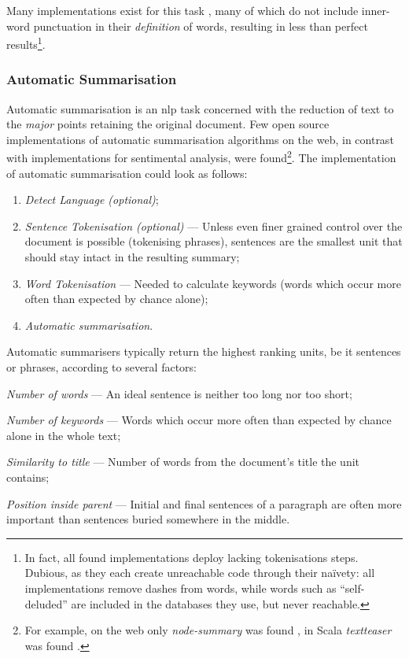 Many implementations exist for this task
  \autocites{thinkroth/sentimental-source-code}{mileszim/sediment-source-code}
  {thisandagain/sentiment-source-code}, many of which do not include
  inner-word punctuation in their \emph{definition} of words, resulting in
  less than perfect results\footnote{In fact, all found implementations
      deploy lacking tokenisations steps.
    Dubious, as they each create unreachable code through their na\"ivety:
      all implementations remove dashes from words, while words such as
      ``self-deluded'' are included in the databases they use, but never
      reachable.}.

\subsubsection{Automatic Summarisation}\label{automatic-summarisation}

Automatic summarisation is an \gls{nlp} task concerned with the reduction
  of text to the \emph{major} points retaining the original document.
Few open source implementations of automatic summarisation algorithms on
  the web, in contrast with implementations for sentimental analysis, were
  found\footnote{For example, on the web only \emph{node-summary} was found
    \autocite{jbrooksuk/node-summary-source-code}, in Scala \emph{textteaser}
    was found \autocite{MojoJolo/textteaser-source-code}.}.
The implementation of automatic summarisation could look as follows:

\begin{enumerate}
\item\emph{Detect Language (optional)};
\item\emph{Sentence Tokenisation (optional)} --- Unless even finer grained
  control over the document is possible (tokenising phrases), sentences are
  the smallest unit that should stay intact in the resulting summary;
\item\emph{Word Tokenisation} --- Needed to calculate keywords (words
  which occur more often than expected by chance alone);
\item\emph{Automatic summarisation}.
\end{enumerate}

\noindent Automatic summarisers typically return the highest ranking units,
  be it sentences or phrases, according to several factors:

\begin{aenumerate}
\item\emph{Number of words} --- An ideal sentence is neither too long nor
  too short;
\item\emph{Number of keywords} --- Words which occur more often than
  expected by chance alone in the whole text;
\item\emph{Similarity to title} --- Number of words from the document's
  title the unit contains;
\item\emph{Position inside parent} --- Initial and final sentences of a
  paragraph are often more important than sentences buried somewhere in
  the middle.
\end{aenumerate}

